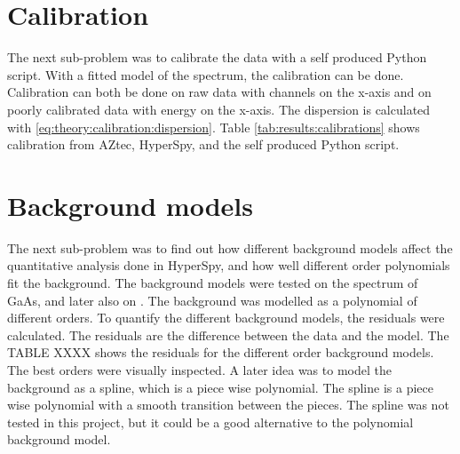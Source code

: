 %
\section{Calibration}
\label{sec:discussion:calibration}


The next sub-problem was to calibrate the data with a self produced Python script.
With a fitted model of the spectrum, the calibration can be done.
Calibration can both be done on raw data with channels on the x-axis and on poorly calibrated data with energy on the x-axis.
The dispersion is calculated with \cref{eq:theory:calibration:dispersion}.
Table \cref{tab:results:calibrations} shows calibration from AZtec, HyperSpy, and the self produced Python script.



%
%
\section{Background models}
\label{sec:discussion:background}



The next sub-problem was to find out how different background models affect the quantitative analysis done in HyperSpy, and how well different order polynomials fit the background.
The background models were tested on the spectrum of GaAs, and later also on .
The background was modelled as a polynomial of different orders.
To quantify the different background models, the residuals were calculated.
The residuals are the difference between the data and the model.
The TABLE XXXX  shows the residuals for the different order background models.
The best orders were visually inspected.
A later idea was to model the background as a spline, which is a piece wise polynomial.
The spline is a piece wise polynomial with a smooth transition between the pieces.
The spline was not tested in this project, but it could be a good alternative to the polynomial background model.


